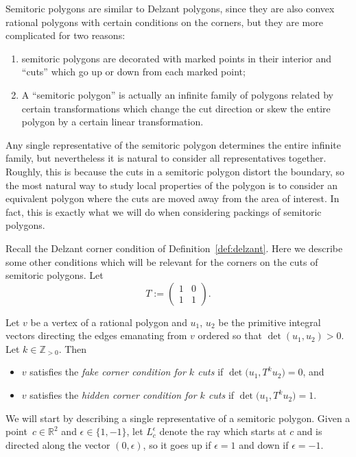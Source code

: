 \documentclass[pdftex]{sigma}
\numberwithin{equation}{section}
\def\R{{\mathbb R}}
\def\Z{{\mathbb Z}}
\begin{document}
Semitoric polygons are similar to Delzant polygons, since they are also convex rational polygons with certain conditions on the corners, but they are more complicated for two reasons:
\begin{enumerate}\itemsep=0pt
 \item[(1)] semitoric polygons are decorated with marked points in their interior and ``cuts'' which go up or down from each marked point;
 \item[(2)] A ``semitoric polygon'' is actually an infinite family of polygons related by certain transformations which change the cut direction or skew the entire polygon by a certain linear transformation.
\end{enumerate}
Any single representative of the semitoric polygon determines the entire infinite family, but nevertheless it is natural to consider all representatives together.
Roughly, this is because the cuts in a semitoric polygon distort the boundary, so the most natural way to study local properties of the polygon is to consider an equivalent polygon where the cuts are moved away from the area of interest. In fact, this is exactly what we will do when considering packings of semitoric polygons.

Recall the Delzant corner condition of Definition~\ref{def:delzant}. Here we describe some other conditions which will be relevant for the corners on the cuts of semitoric polygons.
Let
\begin{equation}\label{eqn:T}
T := \begin{pmatrix} 1 & 0 \\ 1 & 1 \end{pmatrix}.
\end{equation}

\begin{Definition}\label{def:fake_hidden}
Let $v$ be a vertex of a rational polygon and $u_1$, $u_2$ be the primitive integral vectors directing the edges emanating from $v$ ordered so that $\det (u_1, u_2) > 0$. Let $k\in\Z_{> 0}$. Then \begin{itemize}\itemsep=0pt
 \item $v$ satisfies the \emph{fake corner condition for $k$ cuts} if $\det \big(u_1,T^k u_2\big) = 0$, and
 \item $v$ satisfies the \emph{hidden corner condition for $k$ cuts} if $\det \big(u_1,T^k u_2\big) = 1$.
\end{itemize}
\end{Definition}

We will start by describing a single representative of a semitoric polygon.
Given a point~$c\in\R^2$ and $\epsilon\in\{1,-1\}$, let $L_c^\epsilon$ denote the ray which starts at $c$ and is directed along the vector $(0,\epsilon)$, so it goes up if $\epsilon=1$ and down if $\epsilon=-1$.
\end{document}
